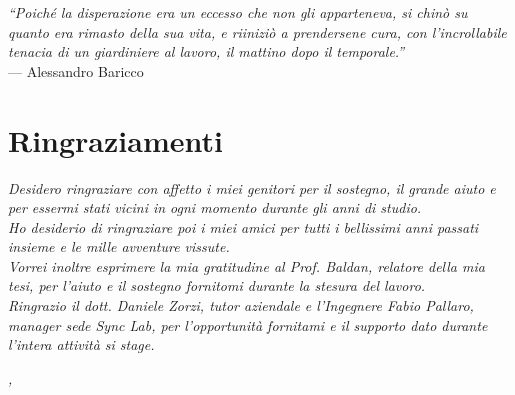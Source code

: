 
\cleardoublepage
{}
{}

\begin{flushright}{
	\slshape    
	``Poiché la disperazione era un eccesso che non gli apparteneva, si chinò su quanto era rimasto della sua vita, e riiniziò a prendersene cura, con l’incrollabile tenacia di un giardiniere al lavoro, il mattino dopo il temporale.''} \\ 
	\medskip
    --- Alessandro Baricco
\end{flushright}

\bigskip

\begingroup
\let\clearpage\relax
\let\cleardoublepage\relax
\let\cleardoublepage\relax

\chapter*{Ringraziamenti}

\noindent \textit{Desidero ringraziare con affetto i miei genitori per il sostegno, il grande aiuto e per essermi stati vicini in ogni momento durante gli anni di studio.}\\

\noindent \textit{Ho desiderio di ringraziare poi i miei amici per tutti i bellissimi anni passati insieme e le mille avventure vissute.}\\


\noindent \textit{Vorrei inoltre esprimere la mia gratitudine al Prof. Baldan, relatore della mia tesi, per l'aiuto e il sostegno fornitomi durante la stesura del lavoro.}\\

\noindent \textit{Ringrazio il dott. Daniele Zorzi, tutor aziendale e l'Ingegnere Fabio Pallaro, manager sede Sync Lab, per l'opportunità
	fornitami e il supporto dato durante l'intera attività si stage.}\\


\bigskip

\noindent\textit{\myLocation, \myTime}
\hfill \myName

\endgroup

